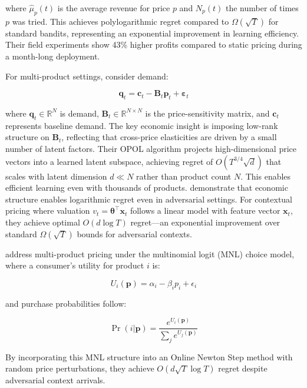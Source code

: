 where $\hat{\mu}_p(t)$ is the average revenue for price $p$ and $N_p(t)$ the number of times $p$ was tried. This achieves polylogarithmic regret compared to $\Omega(\sqrt{T})$ for standard bandits, representing an exponential improvement in learning efficiency. Their field experiments show 43\% higher profits compared to static pricing during a month-long deployment.

For multi-product settings, \citet{Mueller2019} consider demand:

\begin{equation}
\mathbf{q}_t = \mathbf{c}_t - \mathbf{B}_t\mathbf{p}_t + \boldsymbol{\varepsilon}_t
\end{equation}

where $\mathbf{q}_t \in \mathbb{R}^N$ is demand, $\mathbf{B}_t \in \mathbb{R}^{N \times N}$ is the price-sensitivity matrix, and $\mathbf{c}_t$ represents baseline demand. The key economic insight is imposing low-rank structure on $\mathbf{B}_t$, reflecting that cross-price elasticities are driven by a small number of latent factors. Their OPOL algorithm projects high-dimensional price vectors into a learned latent subspace, achieving regret of $O(T^{3/4}\sqrt{d})$ that scales with latent dimension $d \ll N$ rather than product count $N$. This enables efficient learning even with thousands of products. \citet{Xu2021} demonstrate that economic structure enables logarithmic regret even in adversarial settings. For contextual pricing where valuation $v_t = \boldsymbol{\theta}^\top \mathbf{x}_t$ follows a linear model with feature vector $\mathbf{x}_t$, they achieve optimal $O(d \log T)$ regret—an exponential improvement over standard $\Omega(\sqrt{T})$ bounds for adversarial contexts.

\citet{Goyal2022} address multi-product pricing under the multinomial logit (MNL) choice model, where a consumer's utility for product $i$ is:

\begin{equation}
U_i(\mathbf{p}) = \alpha_i - \beta_i p_i + \epsilon_i
\end{equation}

and purchase probabilities follow:

\begin{equation}
\Pr(i|\mathbf{p}) = \frac{e^{U_i(\mathbf{p})}}{\sum_j e^{U_j(\mathbf{p})}}
\end{equation}

By incorporating this MNL structure into an Online Newton Step method with random price perturbations, they achieve $O(d\sqrt{T}\log T)$ regret despite adversarial context arrivals.

